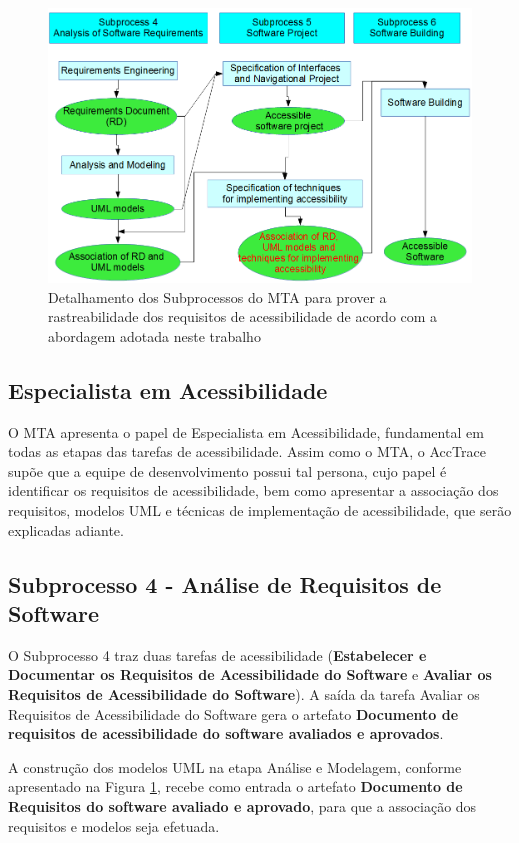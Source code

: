 \documentclass[runningheads,a4paper]{llncs}
\begin{document}
\begin{figure}[h!]
\centering
\includegraphics[scale=0.25]{img/figuramagica.png}
\caption{Detalhamento dos Subprocessos do MTA para prover a rastreabilidade dos
requisitos de acessibilidade de acordo com a abordagem adotada neste trabalho}
\label{fig:figmagica}
\end{figure}

\subsection{Especialista em Acessibilidade}

O MTA apresenta o papel de Especialista em Acessibilidade, fundamental em todas
as etapas das tarefas de acessibilidade. Assim como o MTA, o AccTrace supõe que
a equipe de desenvolvimento possui tal persona, cujo papel é identificar os
requisitos de acessibilidade, bem como apresentar a associação dos requisitos,
modelos UML e técnicas de implementação de acessibilidade, que serão explicadas
adiante.

\subsection{Subprocesso 4 - Análise de Requisitos de Software}

O Subprocesso 4 traz duas tarefas de acessibilidade (\textbf{Estabelecer e
Documentar os Requisitos de Acessibilidade do Software} e \textbf{Avaliar os
Requisitos de Acessibilidade do Software}). A saída da tarefa {Avaliar os
Requisitos de Acessibilidade do Software} gera o artefato \textbf{Documento de
requisitos de acessibilidade do software avaliados e aprovados}.

A construção dos modelos UML na etapa Análise e Modelagem, conforme apresentado
na Figura \ref{fig:figmagica}, recebe como entrada o artefato \textbf{Documento
de Requisitos do software avaliado e aprovado}, para que a associação dos
requisitos e modelos seja efetuada.
\end{document}
